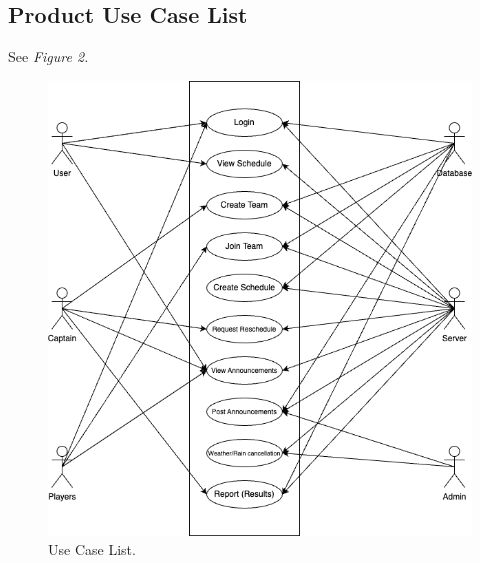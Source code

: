 \documentclass[12pt]{article}
\begin{document}
\subsection{Product Use Case List}
See \textit{Figure 2.}
\begin{figure}
	\includegraphics[width=\linewidth]{Use_case.png}
	\caption{Use Case List.}
	\label{fig:use_case}
\end{figure}
\pagebreak
\end{document}
